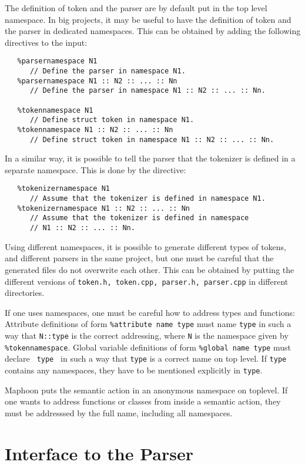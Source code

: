 \documentclass{article}
\begin{document}
\noindent
The definition of token and the parser are by default put 
in the top level namespace.
In big projects, it may be useful to have the definition of
token and the parser in dedicated namespaces. This can be 
obtained by adding the following directives to the input:
\begin{verbatim}
   %parsernamespace N1 
      // Define the parser in namespace N1.
   %parsernamespace N1 :: N2 :: ... :: Nn 
      // Define the parser in namespace N1 :: N2 :: ... :: Nn.

   %tokennamespace N1
      // Define struct token in namespace N1.
   %tokennamespace N1 :: N2 :: ... :: Nn 
      // Define struct token in namespace N1 :: N2 :: ... :: Nn.
\end{verbatim}

In a similar way, it is possible to tell the parser that
the tokenizer is defined in a separate namespace.
This is done by the directive:
\begin{verbatim}
   %tokenizernamespace N1
      // Assume that the tokenizer is defined in namespace N1.
   %tokenizernamespace N1 :: N2 :: ... :: Nn 
      // Assume that the tokenizer is defined in namespace 
      // N1 :: N2 :: ... :: Nn.
\end{verbatim}

\noindent
Using different namespaces, it is possible to generate different
types of tokens, and different parsers in the same project,
but one must be careful that the generated files do not
overwrite each other.
This can be obtained by putting the different versions of 
\verb+token.h, token.cpp, parser.h, parser.cpp+ in
different directories. 

If one uses namespaces, one must be careful how to address 
types and functions:
Attribute definitions of form \verb+%attribute name type+ must
name \verb+type+ in such a way that \verb+N::type+ is the correct
addressing, where \verb+N+ is the namespace given
by \verb+%tokennamespace+. 
Global variable definitions of form \verb+%global name type+ must
declare \verb+ type + in such a way that \verb+type+ is a correct
name on top level. If \verb+type+ contains any namespaces,
they have to be mentioned explicitly in \verb+type+. 

Maphoon puts the semantic action in an anonymous namespace on
toplevel. If one wants to address functions or classes from inside
a semantic action, they must be addresssed by the full name,
including all namespaces. 

\section{Interface to the Parser}
\label{Sect_interface}
\end{document}
